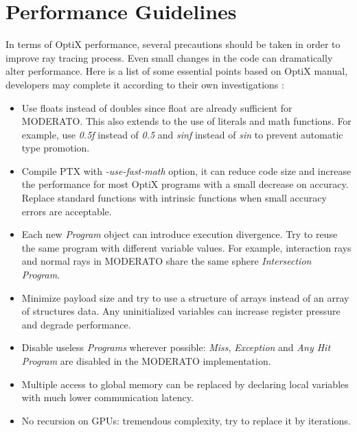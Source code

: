 \section{Performance Guidelines}
In terms of OptiX performance, several precautions should be taken in order to improve ray tracing process. Even small changes in the code can dramatically alter performance. Here is a list of some essential points based on OptiX manual, developers may complete it according to their own investigations \citep{Reference6}:
\begin{itemize}
  \item Use floats instead of doubles since float are already sufficient for MODERATO. This also extends to the use of literals and math functions. For example, use \textit{0.5f} instead of \textit{0.5} and \textit{sinf} instead of \textit{sin} to prevent automatic type promotion. 
  \item Compile PTX with \textit{-use-fast-math} option, it can reduce code size and increase the performance for most OptiX programs with a small decrease on accuracy. Replace standard functions with intrinsic functions when small accuracy errors are acceptable.
  \item Each new \textit{Program} object can introduce execution divergence. Try to reuse the same program with different variable values. For example, interaction rays and normal rays in MODERATO share the same sphere \textit{Intersection Program}.
  \item Minimize payload size and try to use a structure of arrays instead of an array of structures data. Any uninitialized variables can increase register pressure and degrade performance.
  \item Disable useless \textit{Programs} wherever possible: \textit{Miss}, \textit{Exception} and \textit{Any Hit Program} are disabled in the MODERATO implementation.
  \item Multiple access to global memory can be replaced by declaring local variables with much lower communication latency.
  \item No recursion on GPUs: tremendous complexity, try to replace it by iterations.
\end{itemize}

